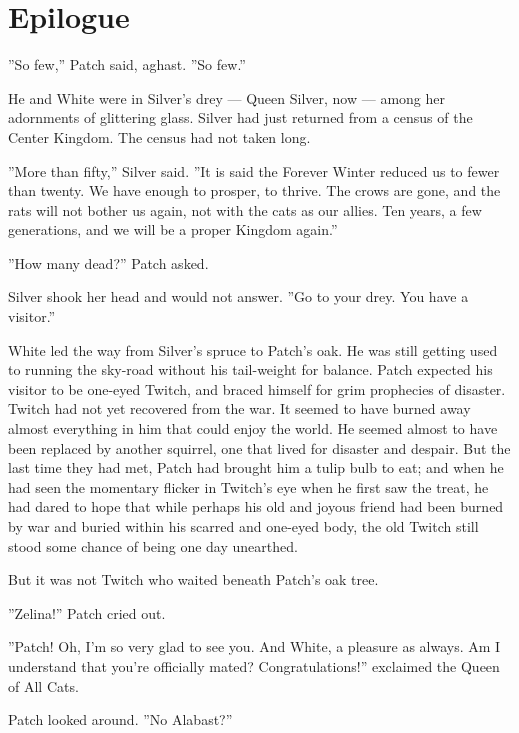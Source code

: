 \documentclass[12pt]{book}
\begin{document}
\section{Epilogue}

''So few,'' Patch said, aghast. ''So few.''

He and White were in Silver's drey ---
Queen Silver, now ---
among her adornments of glittering glass. Silver had just returned from a census of the Center Kingdom. The census had not taken long.

''More than fifty,'' Silver said. ''It is said the Forever Winter reduced us to fewer than twenty. We have enough to prosper, to thrive. The crows are gone, and the rats will not bother us again, not with the cats as our allies. Ten years, a few generations, and we will be a proper Kingdom again.''

''How many dead?'' Patch asked.

Silver shook her head and would not answer. ''Go to your drey. You have a visitor.''

White led the way from Silver's spruce to Patch's oak. He was still getting used to running the sky-road without his tail-weight for balance. Patch expected his visitor to be one-eyed Twitch, and braced himself for grim prophecies of disaster. Twitch had not yet recovered from the war. It seemed to have burned away almost everything in him that could enjoy the world. He seemed almost to have been replaced by another squirrel, one that lived for disaster and despair. But the last time they had met, Patch had brought him a tulip bulb to eat; and when he had seen the momentary flicker in Twitch's eye when he first saw the treat, he had dared to hope that while perhaps his old and joyous friend had been burned by war and buried within his scarred and one-eyed body, the old Twitch still stood some chance of being one day unearthed.

But it was not Twitch who waited beneath Patch's oak tree.

''Zelina!'' Patch cried out.

''Patch! Oh, I'm so very glad to see you. And White, a pleasure as always. Am I understand that you're officially mated? Congratulations!'' exclaimed the Queen of All Cats.

Patch looked around. ''No Alabast?''
\end{document}
